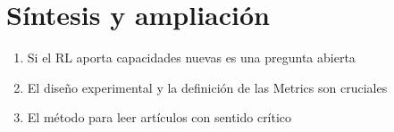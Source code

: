 \section{Síntesis y ampliación}
\begin{enumerate}
  \item Si el RL aporta capacidades nuevas es una pregunta abierta
  \item El diseño experimental y la definición de las Metrics son cruciales
  \item El método para leer artículos con sentido crítico
\end{enumerate}

